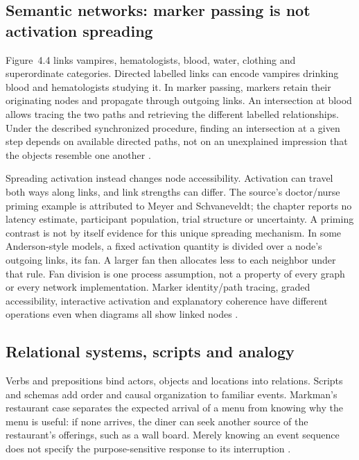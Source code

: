 \subsection{Semantic networks: marker passing is not activation spreading}

Figure~4.4 links vampires, hematologists, blood, water, clothing and
superordinate categories. Directed labelled links can encode vampires
drinking blood and hematologists studying it. In marker passing,
markers retain their originating nodes and propagate through
outgoing links. An intersection at blood allows tracing the two
paths and retrieving the different labelled relationships. Under
the described synchronized procedure, finding an intersection at
a given step depends on available directed paths, not on an
unexplained impression that the objects resemble one another
\cite[p.~44]{Markman2012CognitiveRepresentation}.

Spreading activation instead changes node accessibility. Activation
can travel both ways along links, and link strengths can differ.
The source's doctor/nurse priming example is attributed to Meyer
and Schvaneveldt; the chapter reports no latency estimate, participant
population, trial structure or uncertainty. A priming contrast is
not by itself evidence for this unique spreading mechanism.
In some Anderson-style models, a fixed activation quantity is
divided over a node's outgoing links, its fan. A larger fan then
allocates less to each neighbor under that rule. Fan division is
one process assumption, not a property of every graph or every
network implementation. Marker identity/path tracing, graded
accessibility, interactive activation and explanatory coherence
have different operations even when diagrams all show linked nodes
\cite[pp.~44--45]{Markman2012CognitiveRepresentation}.

\subsection{Relational systems, scripts and analogy}

Verbs and prepositions bind actors, objects and locations into
relations. Scripts and schemas add order and causal organization
to familiar events. Markman's restaurant case separates the expected
arrival of a menu from knowing why the menu is useful: if none
arrives, the diner can seek another source of the restaurant's
offerings, such as a wall board. Merely knowing an event sequence
does not specify the purpose-sensitive response to its interruption
\cite[p.~45]{Markman2012CognitiveRepresentation}.

